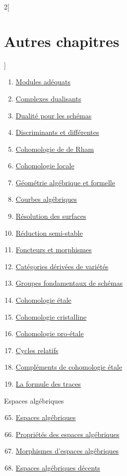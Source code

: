 \begin{multicols}{2}[\section{Autres chapitres}]
\begin{enumerate}
\item \hyperref[adequate-section-phantom]{Modules adéquats}
\item \hyperref[dualizing-section-phantom]{Complexes dualisants}
\item \hyperref[duality-section-phantom]{Dualité pour les schémas}
\item \hyperref[discriminant-section-phantom]{Discriminants et différentes}
\item \hyperref[derham-section-phantom]{Cohomologie de de Rham}
\item \hyperref[local-cohomology-section-phantom]{Cohomologie locale}
\item \hyperref[algebraization-section-phantom]{Géométrie algébrique et formelle}
\item \hyperref[curves-section-phantom]{Courbes algébriques}
\item \hyperref[resolve-section-phantom]{Résolution des surfaces}
\item \hyperref[models-section-phantom]{Réduction semi-stable}
\item \hyperref[functors-section-phantom]{Foncteurs et morphismes}
\item \hyperref[equiv-section-phantom]{Catégories dérivées de variétés}
\item \hyperref[pione-section-phantom]{Groupes fondamentaux de schémas}
\item \hyperref[etale-cohomology-section-phantom]{Cohomologie étale}
\item \hyperref[crystalline-section-phantom]{Cohomologie cristalline}
\item \hyperref[proetale-section-phantom]{Cohomologie pro-étale}
\item \hyperref[relative-cycles-section-phantom]{Cycles relatifs}
\item \hyperref[more-etale-section-phantom]{Compléments de cohomologie étale}
\item \hyperref[trace-section-phantom]{La formule des traces}
\end{enumerate}
Espaces algébriques
\begin{enumerate}
\setcounter{enumi}{64}
\item \hyperref[spaces-section-phantom]{Espaces algébriques}
\item \hyperref[spaces-properties-section-phantom]{Propriétés des espaces algébriques}
\item \hyperref[spaces-morphisms-section-phantom]{Morphismes d'espaces algébriques}
\item \hyperref[decent-spaces-section-phantom]{Espaces algébriques décents}

\end{enumerate}
\end{multicols}
